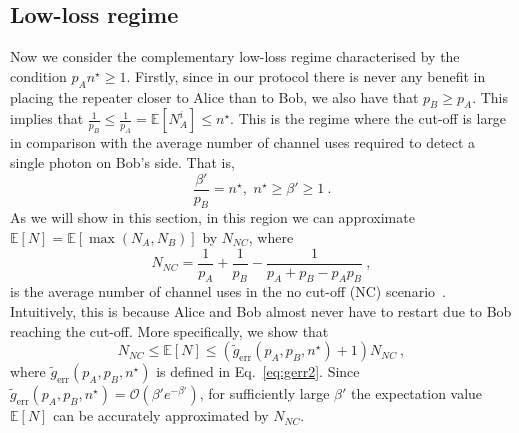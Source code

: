 \documentclass[aps,pra,reprint,superscriptaddress]{revtex4-1}
\newcommand{\nstar}{n^{\star}}
\begin{document}
\subsection*{Low-loss regime}
Now we consider the complementary low-loss regime characterised by the condition $p_A \nstar \geq 1$. Firstly, since in our protocol there is never any benefit in placing the repeater closer to Alice than to Bob, we also have that $p_B \ge p_A$. This implies that $\frac{1}{p_B} \le \frac{1}{p_A} = \mathbb{E}[N_A^i] \leq \nstar$. This is the regime where the cut-off is large in comparison with the average number of channel uses required to detect a single photon on Bob's side. That is,
\begin{equation}
\frac{\beta'}{p_B} =\nstar, \,\, \nstar \ge \beta'\geq1\ .
\end{equation}
As we will show in this section, in this region we can approximate  $\mathbb{E}\left[N\right] = \mathbb{E}\left[\max(N_A, N_B)\right]$ by $N_{NC}$, where
\begin{equation}
N_{NC} = \frac{1}{p_A} + \frac{1}{p_B} - \frac{1}{p_A + p_B-p_A p_B}\ ,
\end{equation}
is the average number of channel uses in the no cut-off (NC) scenario~\cite{panayi2014memory,luong2015overcoming}. Intuitively, this is because Alice and Bob almost never have to restart due to Bob reaching the cut-off. More specifically, we show that
\begin{equation}
N_{NC}  \leq \mathbb{E}\left[N\right] \leq  \left(\tilde{g}_\text{err}(p_A, p_B, \nstar) +1\right) N_{NC}\label{eq:nccondition}\ ,
\end{equation}
where $\tilde{g}_\text{err}(p_A, p_B, \nstar)$ is defined in Eq.~\eqref{eq:gerr2}. Since $\tilde{g}_\text{err}(p_A, p_B, \nstar) = \mathcal{O}\left(\beta' e^{-\beta'}\right)$, for sufficiently large $\beta'$ the expectation value $\mathbb{E}\left[N\right]$ can be accurately approximated by $N_{NC}$. \\
\end{document}
